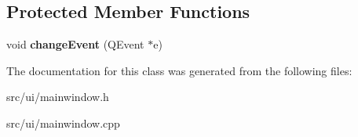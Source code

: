 \subsection*{Protected Member Functions}
\begin{DoxyCompactItemize}
\item 
\hypertarget{classMainWindow_af4ca5d0d3d18ddcb7d54b6596bbf4797}{
void {\bfseries changeEvent} (QEvent $\ast$e)}
\label{classMainWindow_af4ca5d0d3d18ddcb7d54b6596bbf4797}

\end{DoxyCompactItemize}


The documentation for this class was generated from the following files:\begin{DoxyCompactItemize}
\item 
src/ui/mainwindow.h\item 
src/ui/mainwindow.cpp\end{DoxyCompactItemize}

